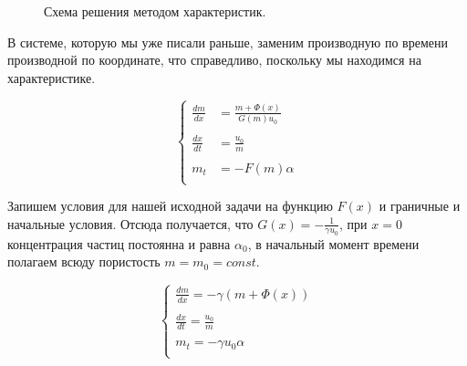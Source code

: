 \documentclass[a4paper,12pt]{article}
\renewcommand{\d}{\displaystyle}
\begin{document}
\begin{figure}[h!]
\caption{Схема решения методом характеристик.}
\label{fig:image1}
\end{figure}

\par В системе, которую мы уже писали раньше, заменим производную по времени производной по координате, что справедливо, поскольку мы находимся на характеристике.

\begin{equation*}
\begin{cases}

\d \frac{dm}{dx} &= \d \frac{m+\Phi(x)}{G(m)u_{0}}\\
&\\
\d \frac{dx}{dt}&= \d \frac{u_{0}}{m}\\
&\\
m_{t} &= -F(m)\alpha\\

\end{cases}
\end{equation*}

\par Запишем условия для нашей исходной задачи на функцию $F(x)$ и граничные и начальные условия. Отсюда получается, что $\d G(x)=-\frac{1}{\gamma u_{0}}$, при $x=0$ концентрация частиц постоянна и равна $\alpha_{0}$, в начальный момент времени полагаем всюду пористость $m=m_{0} = const$.

\begin{equation*}
\begin{cases}

\d \frac{dm}{dx} = \d -\gamma (m+\Phi(x))\\
{}\\
\d \frac{dx}{dt}= \d \frac{u_{0}}{m}\\
{}\\
m_{t} = -\gamma u_{0}\alpha\\

\end{cases}
\end{equation*}
\end{document}
